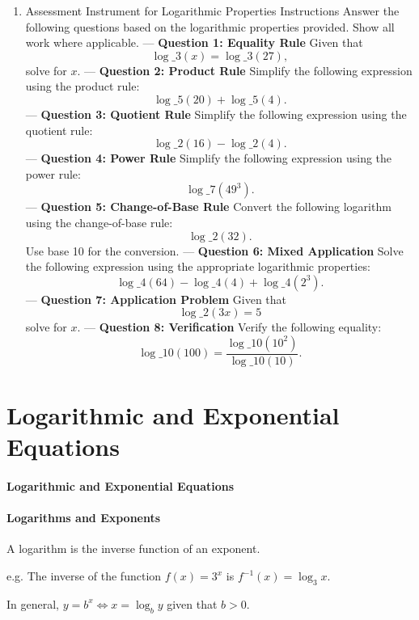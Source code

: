\begin{enumerate}
    \item Assessment Instrument for Logarithmic Properties Instructions Answer the following questions based on the logarithmic properties provided. Show all work where applicable. --- \textbf{Question 1: Equality Rule} Given that $$ \log\_3(x) = \log\_3(27), $$ solve for $x$. --- \textbf{Question 2: Product Rule} Simplify the following expression using the product rule: $$ \log\_5(20) + \log\_5(4). $$ --- \textbf{Question 3: Quotient Rule} Simplify the following expression using the quotient rule: $$ \log\_2(16) - \log\_2(4). $$ --- \textbf{Question 4: Power Rule} Simplify the following expression using the power rule: $$ \log\_7(49^3). $$ --- \textbf{Question 5: Change-of-Base Rule} Convert the following logarithm using the change-of-base rule: $$ \log\_2(32). $$ Use base 10 for the conversion. --- \textbf{Question 6: Mixed Application} Solve the following expression using the appropriate logarithmic properties: $$ \log\_4(64) - \log\_4(4) + \log\_4(2^3). $$ --- \textbf{Question 7: Application Problem} Given that $$ \log\_2(3x) = 5 $$ solve for $x$. --- \textbf{Question 8: Verification} Verify the following equality: $$ \log\_{10}(100) = \frac{\log\_{10}(10^2)}{\log\_{10}(10)}. $$
\end{enumerate}

\section{Logarithmic and Exponential Equations}
\label{sec:logarithmic-and-exponential-equations}

\paragraph{Logarithmic and Exponential Equations}

\paragraph{Logarithms and Exponents}

A logarithm is the inverse function of an exponent.

e.g. The inverse of the function $f(x) = 3^x$ is $f^{-1}(x) = \log_3 x$.

In general, $y = b^x \iff x = \log_b y$ given that $b > 0$.

